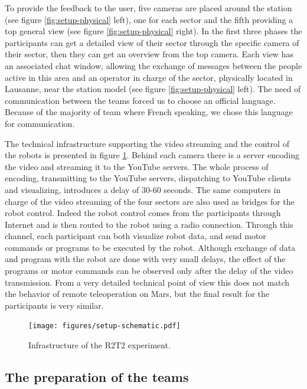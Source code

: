 \documentclass{intech-journal}
\begin{document}
To provide the feedback to the user, five cameras are placed around the station (see figure \ref{fig:setup-physical} left), one for each sector and the fifth providing a top general view (see figure \ref{fig:setup-physical} right).
In the first three phases the participants can get a detailed view of their sector through the specific camera of their sector, then they can get an overview from the top camera.
Each view has an associated chat window, allowing the exchange of messages between the people active in this area and an operator in charge of the sector, physically located in Lausanne, near the station model (see figure \ref{fig:setup-physical} left).
The need of communication between the teams forced us to choose an official language. 
Because of the majority of team where French speaking, we chose this language for communication.

The technical infrastructure supporting the video streaming and the control of the robots is presented in figure \ref{fig:setup-scheme}.
Behind each camera there is a server encoding the video and streaming it to the YouTube servers. 
The whole process of encoding, transmitting to the YouTube servers, dispatching to YouTube clients and visualizing, introduces a delay of 30-60 seconds.
The same computers in charge of the video streaming of the four sectors are also used as bridges for the robot control. 
Indeed the robot control comes from the participants through Internet and is then routed to the robot using a radio connection. 
Through this channel, each participant can both visualize robot data, and send motor commands or programs to be executed by the robot. 
Although exchange of data and program with the robot are done with very small delays, the effect of the programs or motor commands can be observed only after the delay of the video transmission. 
From a very detailed technical point of view this does not match the behavior of remote teleoperation on Mars, but the final result for the participants is very similar.

\begin{figure}[ht]
 \centering
    \texttt{[image: figures/setup-schematic.pdf]}
  \caption{Infrastructure of the R2T2 experiment.}
  \label{fig:setup-scheme} 
\end{figure}

\subsection{The preparation of the teams}
\end{document}
